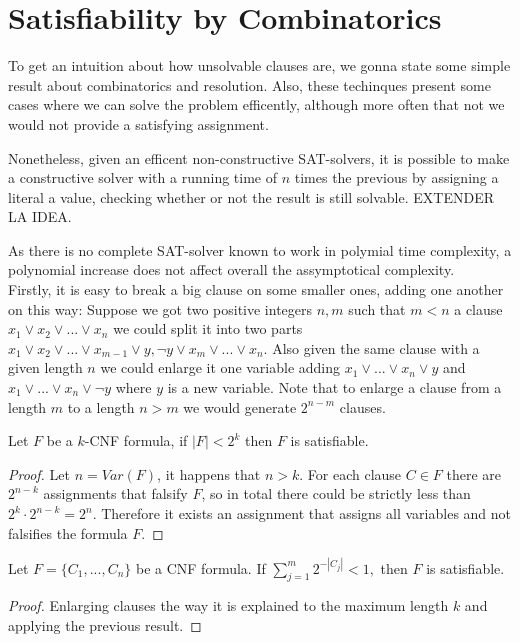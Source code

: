 \section{Satisfiability by Combinatorics}


To get an intuition about how unsolvable clauses are, we gonna state some simple result about combinatorics and resolution. Also, these techinques present some cases where we can solve the problem efficently, although more often that not we would not provide a satisfying assignment.


Nonetheless, given an efficent non-constructive SAT-solvers, it is possible to make a constructive solver with a running time of $n$ times the previous by assigning a literal a value, checking whether or not the result is still solvable. EXTENDER LA IDEA.


As there is no complete SAT-solver known to work in polymial time complexity, a polynomial increase does not affect overall the assymptotical complexity.\\

Firstly, it is easy to break a big clause on some smaller ones, adding one another on this way: Suppose we got two positive integers $n,m$ such that $m < n$ a clause $x_1\vee x_2 \vee ... \vee x_n$ we could split it into two parts $x_1\vee x_2  \vee ... \vee x_{m-1} \vee y, \neg y \vee x_m \vee ... \vee x_n$. Also given the same clause with a given length $n$ we could enlarge it one variable adding $ x_1 \vee ... \vee x_n \vee y$ and $ x_1 \vee ... \vee x_n \vee \neg y$ where $y$ is a new variable. Note that to enlarge a clause from a length $m$ to a length $n>m$ we would generate $2^{n-m}$ clauses.

\begin{proposition}
	Let $F$ be a $k$-CNF formula, if $|F| < 2^k$ then $F$ is satisfiable.
\end{proposition}
\begin{proof}
	Let $n = Var(F)$, it happens that $n > k$. For each clause $C \in F$ there are $2^{n-k}$ assignments that falsify $F$, so in total there could be strictly less than $2^k \cdot 2^{n-k} = 2^n.$ Therefore it exists an assignment that assigns all variables and not falsifies the formula $F$.
\end{proof}
\begin{proposition}
	Let $F=\{C_1,...,C_n\}$ be a CNF formula. If $\sum_{j=1}^m 2^{-|C_j|}<1,$ then $F$ is satisfiable.
\end{proposition}
\begin{proof}
	Enlarging clauses the way it is explained to the maximum length $k$ and applying the previous result.
\end{proof}


